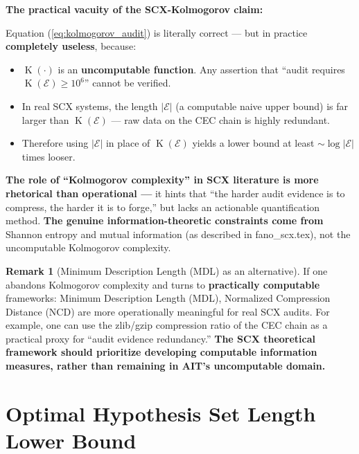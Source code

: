 \documentclass[12pt,a4paper]{article}
\theoremstyle{plain}
\theoremstyle{definition}
\newtheorem{remark}[theorem]{Remark}
\DeclareMathOperator{\Kolm}{K}
\begin{document}
\begin{honestbox}
\textbf{The practical vacuity of the SCX-Kolmogorov claim:}

Equation (\ref{eq:kolmogorov_audit}) is literally correct --- but in practice \textbf{completely useless}, because:
\begin{itemize}
    \item $\Kolm(\cdot)$ is an \textbf{uncomputable function}. Any assertion that ``audit requires $\Kolm(\mathcal{E}) \ge 10^6$'' cannot be verified.
    \item In real SCX systems, the length $|\mathcal{E}|$ (a computable naive upper bound) is far larger than $\Kolm(\mathcal{E})$ ---
    raw data on the CEC chain is highly redundant.
    \item Therefore using $|\mathcal{E}|$ in place of $\Kolm(\mathcal{E})$ yields a lower bound at least $\sim \log |\mathcal{E}|$ times looser.
\end{itemize}

\textbf{The role of ``Kolmogorov complexity'' in SCX literature is more rhetorical than operational ---}
it hints that ``the harder audit evidence is to compress, the harder it is to forge,'' but lacks an actionable quantification method.
\textbf{The genuine information-theoretic constraints come from} Shannon entropy and mutual information (as described in fano\_scx.tex),
not the uncomputable Kolmogorov complexity.
\end{honestbox}

\begin{remark}[Minimum Description Length (MDL) as an alternative]
If one abandons Kolmogorov complexity and turns to \textbf{practically computable} frameworks: Minimum Description Length (MDL),
Normalized Compression Distance (NCD) are more operationally meaningful for real SCX audits.
For example, one can use the zlib/gzip compression ratio of the CEC chain as a practical proxy for ``audit evidence redundancy.''
\textbf{The SCX theoretical framework should prioritize developing computable information measures, rather than remaining in AIT's uncomputable domain.}
\end{remark}

\section{Optimal Hypothesis Set Length Lower Bound}
\label{sec:hypothesis_bound}
\end{document}
